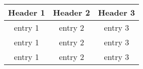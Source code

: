 \documentclass{article}
\newcommand{\head}[1]{\textnormal{\textbf{#1}}}
\begin{document}
\begin{tabular}{ccc} %
\hline %
\head{Header 1} & \head{Header 2} & \head{Header 3}\\
\hline
entry 1 & entry 2 & entry 3\\
entry 1 & entry 2 & entry 3\\
entry 1 & entry 2 & entry 3\\
\hline
\end{tabular}
\end{document}
